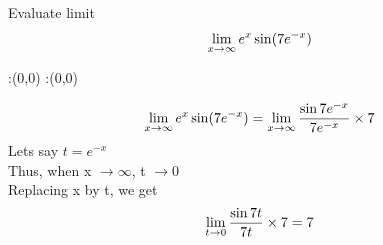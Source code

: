 


\newcommand{\ltinf}{\lim_{x \to \infty}}
\question Evaluate limit 
\begin{align}
\ltinf e^x \sin (\vbone e^{-x}) \notag
\end{align}


\watchout

\ifprintanswers
  \begin{marginfigure}
      :(0,0)
      :(0,0)
    \figdrawbegin{}
      \figdrawline [100,101]
    \figdrawend
    \figvisu{\figBoxA}{}{%
    }
    \centerline{\box\figBoxA}
  \end{marginfigure}
\fi 

\begin{solution}
\begin{align}
\ltinf e^x \sin (\vbone e^{-x}) &= \ltinf \dfrac{\sin {\vbone e^{-x}}}{\vbone e^{-x}} \times \vbone \\
\end{align}
Lets say $t = e^{-x}$ \\
Thus, when x $\rightarrow \infty $, t $\rightarrow 0$ \\
Replacing x by t, we get 
\begin{align}
\lim_{t \to 0}  {\dfrac{\sin{7t}}{7 t} \times 7} = 7 
\end{align} 
\end{solution}


